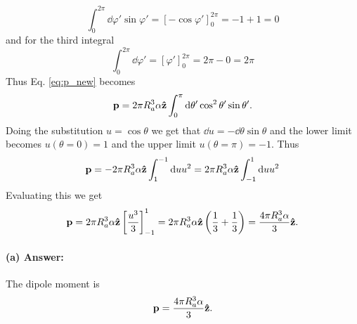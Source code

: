 \begin{equation}
    \int_{0}^{2\pi}\dd\varphi' \sin\varphi' = [-\cos\varphi']_0^{2\pi} = -1 + 1 = 0
\end{equation}
and for the third integral
\begin{equation}
    \int_{0}^{2\pi}\dd\varphi' = [\varphi']_0^{2\pi} = 2\pi -0 = 2\pi
\end{equation}
Thus Eq. \eqref{eq:p_new} becomes
\begin{equation}
    \mathbf{p} = 2\pi R_a^3 \alpha \mathbf{\hat{z}} \int_{0}^{\pi}\dd\theta' \cos^2\theta' \sin\theta'.
\end{equation}
Doing the substitution $u = \cos\theta$ we get that $\dd u = -\dd\theta \sin\theta$ and the lower limit becomes $u(\theta = 0) = 1$ and the upper limit $u(\theta = \pi) = -1$. Thus 
\begin{equation}
    \mathbf{p} = -2\pi R_a^3 \alpha \mathbf{\hat{z}}\int_{1}^{-1} \dd u u^2 = 2\pi R_a^3 \alpha \mathbf{\hat{z}}\int_{-1}^{1} \dd u u^2
\end{equation}
Evaluating this we get
\begin{equation}
    \mathbf{p} = 2\pi R_a^3 \alpha \mathbf{\hat{z}} \left[ \frac{u^3}{3} \right]_{-1}^1 = 2\pi R_a^3 \alpha \mathbf{\hat{z}} \left( \frac{1}{3} + \frac{1}{3} \right) = \frac{4\pi R_a^3 \alpha}{3} \mathbf{\hat{z}}.
\end{equation}
\paragraph{(a) Answer:} The dipole moment is
\begin{equation}
    \mathbf{p} = \frac{4\pi R_a^3 \alpha}{3} \mathbf{\hat{z}}.
\end{equation}

